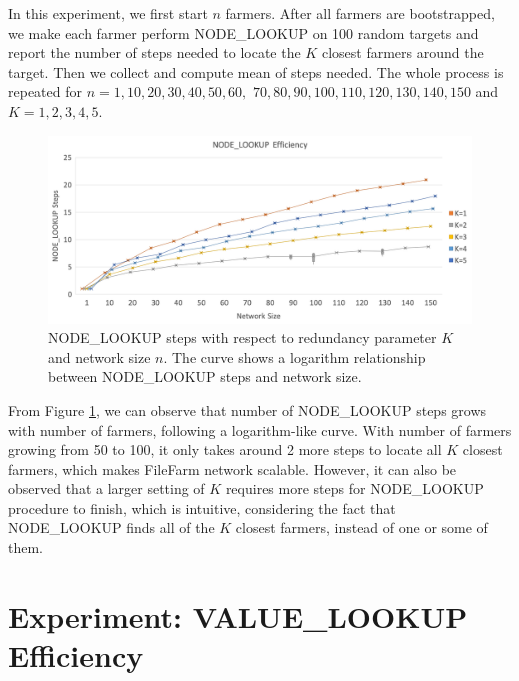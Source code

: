 In this experiment, we first start $n$ farmers. After all farmers are bootstrapped, we make each farmer perform NODE\_LOOKUP on 100 random targets and report the number of steps needed to locate the $K$ closest farmers around the target. Then we collect and compute mean of steps needed. The whole process is repeated for $n=1,10,20,30,40,50,60,$ $70,80,90,100,110,120,130,140,150$ and $K=1,2,3,4,5$.

\begin{figure}[hbt]
\centering
  \includegraphics[width=14cm]{charts/chart_node_lookup_efficiency.png}
  \caption[NODE\_LOOKUP steps with respect to $K$ and network size $n$]{NODE\_LOOKUP steps with respect to redundancy parameter $K$ and network size $n$. The curve shows a logarithm relationship between NODE\_LOOKUP steps and network size.}
  \label{fig:nodelookupefficiency}
\end{figure}

From Figure \ref{fig:nodelookupefficiency}, we can observe that number of NODE\_LOOKUP steps grows with number of farmers, following a logarithm-like curve. With number of farmers growing from 50 to 100, it only takes around 2 more steps to locate all $K$ closest farmers, which makes FileFarm network scalable. However, it can also be observed that a larger setting of $K$ requires more steps for NODE\_LOOKUP procedure to finish, which is intuitive, considering the fact that NODE\_LOOKUP finds all of the $K$ closest farmers, instead of one or some of them.


\section{Experiment: VALUE\_LOOKUP Efficiency}
\label{s:expvaluelookupefficiency}

